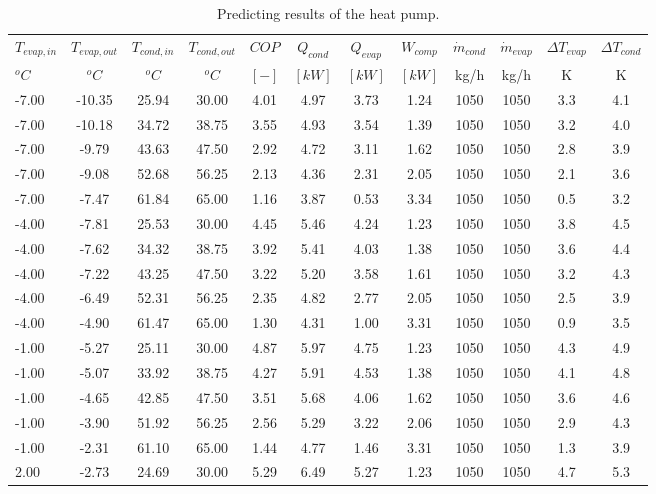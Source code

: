 \documentclass[english]{SPFShortReport}
\begin{document}
\begin{table}[!ht]
\begin{small}
\caption{Predicting results of the heat pump.}
\begin{center}
\resizebox{12cm}{!} 
{
\begin{tabular}{l | c c c c c c c c c c c } 
\hline
\hline
$T_{evap,in}$ &$T_{evap,out}$ &$T_{cond,in}$ &$T_{cond,out}$ &$COP$ &$Q_{cond}$ &$Q_{evap}$ &$W_{comp}$ &$\dot m_{cond}$ &$\dot m_{evap}$ &$\Delta T_{evap}$ &$\Delta T_{cond}$ \\ 
$^oC$ &$^oC$ &$^oC$ &$^oC$ &$[-]$ &$[kW]$ &$[kW]$ &$[kW]$ &kg/h &kg/h &K &K\\ 
\hline
-7.00 & -10.35 & 25.94 & 30.00 & 4.01 & 4.97 & 3.73 & 1.24 & 1050 & 1050 & 3.3 & 4.1\\ 
-7.00 & -10.18 & 34.72 & 38.75 & 3.55 & 4.93 & 3.54 & 1.39 & 1050 & 1050 & 3.2 & 4.0\\ 
-7.00 & -9.79 & 43.63 & 47.50 & 2.92 & 4.72 & 3.11 & 1.62 & 1050 & 1050 & 2.8 & 3.9\\ 
-7.00 & -9.08 & 52.68 & 56.25 & 2.13 & 4.36 & 2.31 & 2.05 & 1050 & 1050 & 2.1 & 3.6\\ 
-7.00 & -7.47 & 61.84 & 65.00 & 1.16 & 3.87 & 0.53 & 3.34 & 1050 & 1050 & 0.5 & 3.2\\ 
-4.00 & -7.81 & 25.53 & 30.00 & 4.45 & 5.46 & 4.24 & 1.23 & 1050 & 1050 & 3.8 & 4.5\\ 
-4.00 & -7.62 & 34.32 & 38.75 & 3.92 & 5.41 & 4.03 & 1.38 & 1050 & 1050 & 3.6 & 4.4\\ 
-4.00 & -7.22 & 43.25 & 47.50 & 3.22 & 5.20 & 3.58 & 1.61 & 1050 & 1050 & 3.2 & 4.3\\ 
-4.00 & -6.49 & 52.31 & 56.25 & 2.35 & 4.82 & 2.77 & 2.05 & 1050 & 1050 & 2.5 & 3.9\\ 
-4.00 & -4.90 & 61.47 & 65.00 & 1.30 & 4.31 & 1.00 & 3.31 & 1050 & 1050 & 0.9 & 3.5\\ 
-1.00 & -5.27 & 25.11 & 30.00 & 4.87 & 5.97 & 4.75 & 1.23 & 1050 & 1050 & 4.3 & 4.9\\ 
-1.00 & -5.07 & 33.92 & 38.75 & 4.27 & 5.91 & 4.53 & 1.38 & 1050 & 1050 & 4.1 & 4.8\\ 
-1.00 & -4.65 & 42.85 & 47.50 & 3.51 & 5.68 & 4.06 & 1.62 & 1050 & 1050 & 3.6 & 4.6\\ 
-1.00 & -3.90 & 51.92 & 56.25 & 2.56 & 5.29 & 3.22 & 2.06 & 1050 & 1050 & 2.9 & 4.3\\ 
-1.00 & -2.31 & 61.10 & 65.00 & 1.44 & 4.77 & 1.46 & 3.31 & 1050 & 1050 & 1.3 & 3.9\\ 
2.00 & -2.73 & 24.69 & 30.00 & 5.29 & 6.49 & 5.27 & 1.23 & 1050 & 1050 & 4.7 & 5.3\\ 

\end{tabular}}
\end{center}
\end{small}
\end{table}
\end{document}
